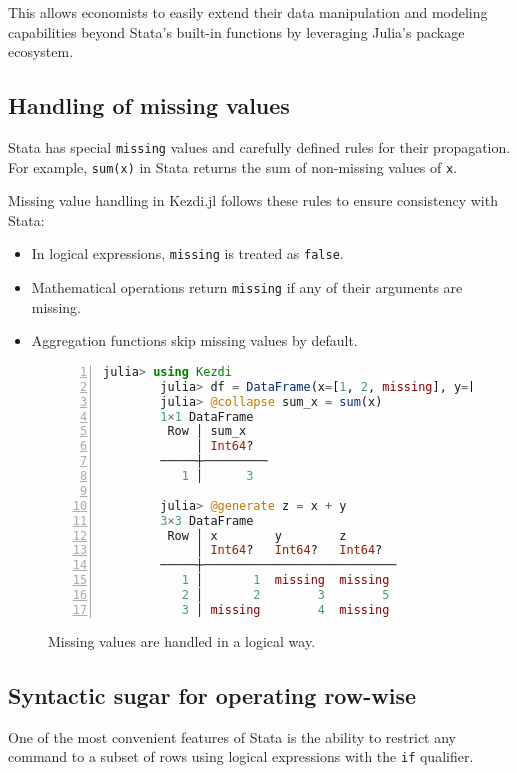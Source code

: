 \documentclass{juliacon}
\begin{document}
This allows economists to easily extend their data manipulation and modeling capabilities beyond Stata's built-in functions by leveraging Julia's package ecosystem.

\subsection{Handling of missing values}

Stata has special \texttt{missing} values and carefully defined rules for their propagation. For example, \texttt{sum(x)} in Stata returns the sum of non-missing values of \texttt{x}.

Missing value handling in Kezdi.jl follows these rules to ensure consistency with Stata:

\begin{itemize}
	\item In logical expressions, \texttt{missing} is treated as \texttt{false}.
	\item Mathematical operations return \texttt{missing} if any of their arguments are missing.
	\item Aggregation functions skip missing values by default.
\end{itemize}


\begin{figure}[t]
	\begin{lstlisting}[language = Julia, numbers=left, numberstyle=\tiny\color{gray}]
		julia> using Kezdi
		julia> df = DataFrame(x=[1, 2, missing], y=[missing, 3, 4])
		julia> @collapse sum_x = sum(x)
		1×1 DataFrame
		 Row │ sum_x   
			 │ Int64?  
		─────┼─────────
		   1 │      3
		
		julia> @generate z = x + y
		3×3 DataFrame
		 Row │ x        y        z
			 │ Int64?   Int64?   Int64?
		─────┼───────────────────────────
		   1 │       1  missing  missing
		   2 │       2        3        5
		   3 │ missing        4  missing
			\end{lstlisting}
	
\caption{Missing values are handled in a logical way.}
\label{fig:missing}
\end{figure}

\subsection{Syntactic sugar for operating row-wise}

One of the most convenient features of Stata is the ability to restrict any command to a subset of rows using logical expressions with the \texttt{if} qualifier.
\end{document}
